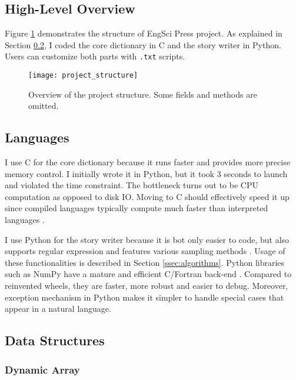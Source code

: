 \documentclass[../main.tex]{subfiles}
\begin{document}
\subsection{High-Level Overview}

Figure \ref{fig:project_structure} demonstrates the structure of EngSci Press project. As explained in Section \ref{ssec:languages}, I coded the core dictionary in C and the story writer in Python. Users can customize both parts with \texttt{.txt} scripts.

\begin{figure}
	\centering
	\texttt{[image: project\_structure]}
	\caption{Overview of the project structure. Some fields and methods are omitted.}
	\label{fig:project_structure}
\end{figure}

\subsection{Languages}
\label{ssec:languages}

I use C for the core dictionary because it runs faster and provides more precise memory control. I initially wrote it in Python, but it took 3 seconds to launch and violated the time constraint. The bottleneck turns out to be CPU computation as opposed to disk IO. Moving to C should effectively speed it up since compiled languages typically compute much faster than interpreted languages \cite{bib:compiled_vs_interpreted}.

I use Python for the story writer because it is bot only easier to code, but also supports regular expression and features various sampling methods \cite{bib:numpy_sampling}. Usage of these functionalities is described in Section \ref{ssec:algorithms}. Python libraries such as NumPy have a mature and efficient C/Fortran back-end \cite{bib:numpy_source_code}. Compared to reinvented wheels, they are faster, more robust and easier to debug. Moreover, exception mechanism in Python makes it simpler to handle special cases that appear in a natural language.

\subsection{Data Structures}

\subsubsection{Dynamic Array}
\end{document}
